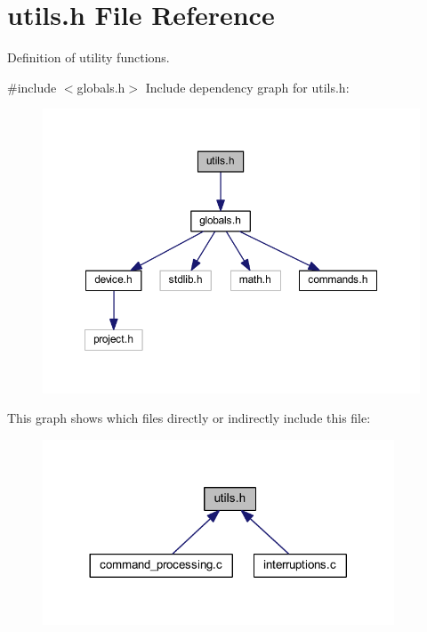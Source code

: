 \section{utils.\+h File Reference}
\label{utils_8h}


Definition of utility functions.  


{\ttfamily \#include $<$globals.\+h$>$}\newline
Include dependency graph for utils.\+h\+:
\nopagebreak
\begin{figure}[H]
\begin{center}
\leavevmode
\includegraphics[width=350pt]{utils_8h__incl}
\end{center}
\end{figure}
This graph shows which files directly or indirectly include this file\+:
\nopagebreak
\begin{figure}[H]
\begin{center}
\leavevmode
\includegraphics[width=296pt]{utils_8h__dep__incl}
\end{center}
\end{figure}
